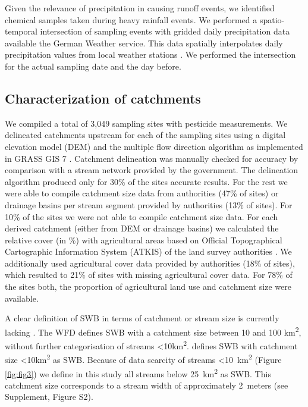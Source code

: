 \documentclass[journal=esthag,manuscript=article]{achemso}
\begin{document}
Given the relevance of precipitation in causing runoff events, we identified chemical samples taken during heavy rainfall events.
We performed a spatio-temporal intersection of sampling events with gridded daily precipitation data available the German Weather service.
This data spatially interpolates daily precipitation values from local weather stations \citep{rauthe_central_2013}. 
We performed the intersection for the actual sampling date and the day before.

\subsection{Characterization of catchments}
We compiled a total of 3,049 sampling sites with pesticide measurements.
We delineated catchments upstream for each of the sampling sites using a digital elevation model (DEM) \citep{eea_digital_2013} and the multiple flow direction algorithm \citep{holmgren_multiple_1994} as implemented in GRASS GIS 7 \citep{neteler_grass_2012}.
Catchment delineation was manually checked for accuracy by comparison with a stream network provided by the government.
The delineation algorithm produced only for 30\% of the sites accurate results.
For the rest we were able to compile catchment size data from authorities (47\% of sites) or drainage basins per stream segment provided by authorities (13\% of sites).
For 10\% of the sites we were not able to compile catchment size data.
For each derived catchment (either from DEM or drainage basins) we calculated the relative cover (in \%) with agricultural areas based on Official Topographical Cartographic Information System (ATKIS) of the land survey authorities \citep{adv_atkis_2016}.
We additionally used agricultural cover data provided by authorities (18\% of sites), which resulted to 21\% of sites with missing agricultural cover data. 
For 78\% of the sites both, the proportion of agricultural land use and catchment size were available.

A clear definition of SWB in terms of catchment or stream size is currently lacking \citep{lorenz_specifics_2016}. 
The WFD defines SWB with a catchment size between 10 and 100 km\textsuperscript{2}, without further categorisation of streams \textless 10km\textsuperscript{2}. 
\citet{lorenz_specifics_2016} defines SWB with catchment size \textless 10km\textsuperscript{2} as SWB.
Because of data scarcity of streams \textless 10~km\textsuperscript{2} (Figure \ref{fig:fig3}) we define in this study all streams below 25~km\textsuperscript{2} as SWB. This catchment size corresponds to a stream width of approximately 2~meters (see Supplement, Figure S2).
\end{document}
